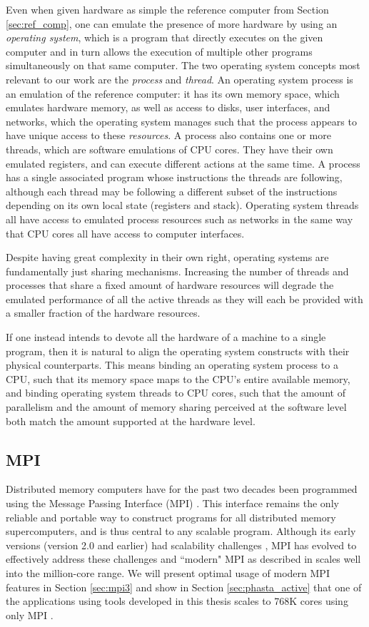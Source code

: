 Even when given hardware as simple the reference
computer from Section \ref{sec:ref_comp}, one can emulate
the presence of more hardware by using an \emph{operating system},
which is a program that directly executes on the given computer
and in turn allows the execution of multiple other programs
simultaneously on that same computer.
The two operating system concepts most relevant to our work
are the \emph{process} and \emph{thread}.
An operating system process is an emulation of the reference computer:
it has its own memory space, which emulates hardware memory,
as well as access to disks, user interfaces, and networks,
which the operating system manages such that the process
appears to have unique access to these \emph{resources}.
A process also contains one or more threads, which are
software emulations of CPU cores.
They have their own emulated registers, and can execute
different actions at the same time.
A process has a single associated program whose instructions
the threads are following, although each thread may be
following a different subset of the instructions depending
on its own local state (registers and stack).
Operating system threads all have access to emulated process
resources such as networks in the same way that CPU cores
all have access to computer interfaces.

Despite having great complexity in their own right, operating
systems are fundamentally just sharing mechanisms.
Increasing the number of threads and processes that share
a fixed amount of hardware resources will degrade the emulated
performance of all the active threads as they will each be
provided with a smaller fraction of the hardware resources.

If one instead intends to devote all the hardware of a machine
to a single program, then it is natural to align the operating
system constructs with their physical counterparts.
This means binding an operating system process to a CPU, such
that its memory space maps to the CPU's entire available memory,
and binding operating system threads to CPU cores, such that
the amount of parallelism and the amount of memory sharing
perceived at the software level both
match the amount supported at the hardware level.

\subsection{MPI}

Distributed memory computers have for the past two decades
been programmed using the Message Passing Interface (MPI)
\cite{hempel1994mpi,walker1996mpi}.
This interface remains the only reliable and portable way to construct
programs for all distributed memory supercomputers,
and is thus central to any scalable program.
Although its early versions (version 2.0 and earlier) had
scalability challenges \cite{balaji2009mpi}, MPI has evolved
to effectively address these challenges and ``modern" MPI
as described in \cite{gropp2014using} scales well into the
million-core range.
We will present optimal usage of modern MPI features in
Section \ref{sec:mpi3} and show in Section \ref{sec:phasta_active}
that one of the applications using tools developed
in this thesis scales to 768K cores using only MPI \cite{rasquinCise2014}.


